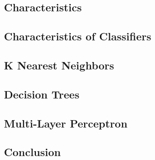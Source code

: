 \subsection{Characteristics}

\subsection{Characteristics of Classifiers}

\subsection{K Nearest Neighbors}

\subsection{Decision Trees}

\subsection{Multi-Layer Perceptron}

\subsection{Conclusion}
